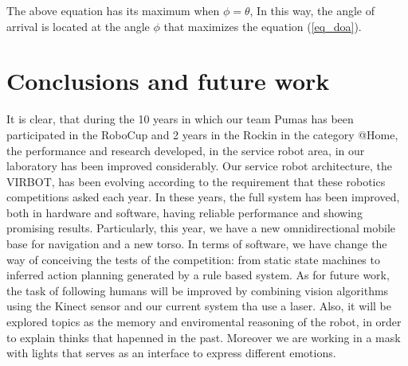 \documentclass{llncs}
\begin{document}
The above equation has its maximum when $\phi=\theta$, In this way, the angle of arrival is located at the angle $\phi$ that maximizes the equation (\ref{eq_doa}).


\section{Conclusions and future work}\label{sec:conclusions}
It is clear, that during the 10 years in which our team Pumas has been participated in the RoboCup and 2 years in the Rockin \cite{Robocup_2017} in the category @Home, the performance and research developed, in the service robot area, in our laboratory has been improved considerably.
Our service robot architecture, the VIRBOT, has been evolving according to the requirement that these robotics competitions asked each year.
In these years, the full system has been improved, both in hardware and software, having reliable performance and showing promising results. Particularly, this year, we have a new omnidirectional mobile base for navigation and a new torso. 
In terms of software, we have change the way of conceiving the tests of the competition: from static state machines to inferred action planning generated by a rule based system. 
As for future work, the task of following humans will be improved by combining vision algorithms using the Kinect sensor and our current system tha use a laser. Also, it will be explored topics as the memory and enviromental reasoning of the robot, in order to explain thinks that hapenned in the past. Moreover we are working in a mask with lights that serves as an interface to express different emotions.


\end{document}
